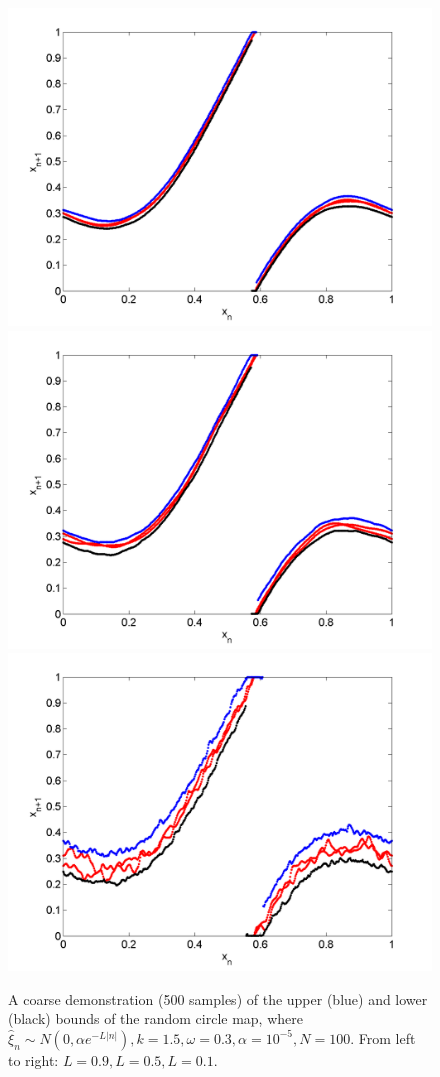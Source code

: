 \begin{figure}[htp]
\caption[Upper and lower bounds on the random circle map, with a normal
distribution, where $k=1.5,\omega=0.3$]{A coarse
  demonstration (500 samples) of the upper (blue) and lower (black)
  bounds of the random circle map, where $\hat{\xi}_n\sim N(0,\alpha
  e^{-L|n|}),k=1.5,\omega=0.3,\alpha = 10^{-5},N=100$. From left to
  right: $L=0.9,L=0.5,L=0.1$.}\label{fig:circ_n_envelope2}
\centering
\includegraphics[width=.3\textwidth]{figs/envelope_norm_500_k15_L09_w03.png}\hfill
\includegraphics[width=.3\textwidth]{figs/envelope_norm_500_k15_L05_w03.png}\hfill
\includegraphics[width=.3\textwidth]{figs/envelope_norm_500_k15_L01_w03.png}
\end{figure}
